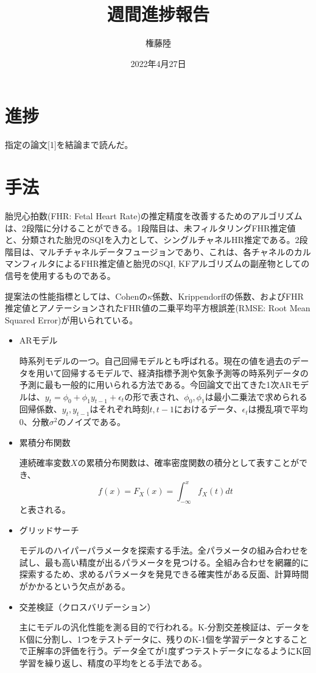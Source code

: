 \documentclass[dvipdfmx]{jsarticle}
\begin{document}
\title{週間進捗報告}
\author{権藤陸}
\date{2022年4月27日}
\maketitle
\section{進捗}
指定の論文[1]を結論まで読んだ。

\section{手法}
胎児心拍数(FHR: Fetal Heart Rate)の推定精度を改善するためのアルゴリズムは、2段階に分けることができる。1段階目は、未フィルタリングFHR推定値と、分類された胎児のSQIを入力として、シングルチャネルHR推定である。2段階目は、マルチチャネルデータフュージョンであり、これは、各チャネルのカルマンフィルタによるFHR推定値と胎児のSQI, KFアルゴリズムの副産物としての信号を使用するものである。

提案法の性能指標としては、Cohenの$\kappa$係数、Krippendorffの係数、およびFHR推定値とアノテーションされたFHR値の二乗平均平方根誤差(RMSE: Root Mean Squared Error)が用いられている。

\begin{itemize}
    \item ARモデル

    時系列モデルの一つ。自己回帰モデルとも呼ばれる。現在の値を過去のデータを用いて回帰するモデルで、経済指標予測や気象予測等の時系列データの予測に最も一般的に用いられる方法である。今回論文で出てきた1次ARモデルは、$y_t = \phi_0 + \phi_1 y_{t-1} +\epsilon_t$の形で表され、$\phi_0, \phi_1$は最小二乗法で求められる回帰係数、$y_{t}, y_{t-1}$はそれぞれ時刻$t, t-1$におけるデータ、$\epsilon_t$は攪乱項で平均0、分散$\sigma^2$のノイズである。
    \item 累積分布関数

    連続確率変数$X$の累積分布関数は、確率密度関数の積分として表すことができ、
    \begin{equation}
    f(x) = F_X (x) = \int_{-\infty}^x f_X (t) dt
    \end{equation}
    と表される。
    \item グリッドサーチ

    モデルのハイパーパラメータを探索する手法。全パラメータの組み合わせを試し、最も高い精度が出るパラメータを見つける。全組み合わせを網羅的に探索するため、求めるパラメータを発見できる確実性がある反面、計算時間がかかるという欠点がある。
    \item 交差検証（クロスバリデーション）
    
    主にモデルの汎化性能を測る目的で行われる。K-分割交差検証は、データをK個に分割し、1つをテストデータに、残りのK-1個を学習データとすることで正解率の評価を行う。データ全てが1度ずつテストデータになるようにK回学習を繰り返し、精度の平均をとる手法である。
\end{itemize}
\end{document}
